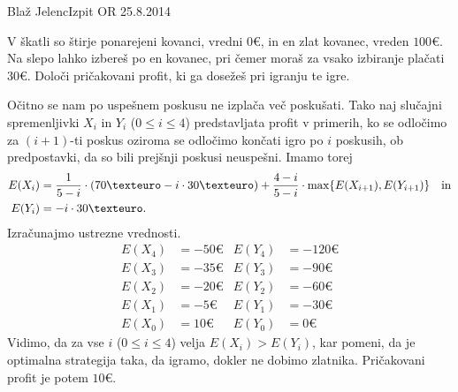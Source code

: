 \begin{naloga}{Blaž Jelenc}{Izpit OR 25.8.2014}
\begin{vprasanje}
V škatli so štirje ponarejeni kovanci, vredni $0 €$,
in en zlat kovanec, vreden $100 €$.
Na slepo lahko izbereš po en kovanec,
pri čemer moraš za vsako izbiranje plačati $30 €$.
Določi pričakovani profit, ki ga dosežeš pri igranju te igre.
\end{vprasanje}

\begin{odgovor}
Očitno se nam po uspešnem poskusu ne izplača več poskušati.
Tako naj slučajni spremenljivki $X_i$ in $Y_i$ ($0 \le i \le 4$)
predstavljata profit v primerih,
ko se odločimo za $(i+1)$-ti poskus
oziroma se odločimo končati igro po $i$ poskusih,
ob predpostavki, da so bili prejšnji poskusi neuspešni.
Imamo torej
\begin{align*}
E(X_i) &= {1 \over 5-i} \cdot (70 € - i \cdot 30 €)
    + {4-i \over 5-i} \cdot \max\{E(X_{i+1}), E(Y_{i+1})\}
\quad \text{in} \\
E(Y_i) &= -i \cdot 30 € .
\end{align*}
Izračunajmo ustrezne vrednosti.
\begin{align*}
E(X_4) &= -50 € & E(Y_4) &= -120 € \\
E(X_3) &= -35 € & E(Y_3) &= -90 € \\
E(X_2) &= -20 € & E(Y_2) &= -60 € \\
E(X_1) &=  -5 € & E(Y_1) &= -30 € \\
E(X_0) &=  10 € & E(Y_0) &=   0 €
\end{align*}
Vidimo, da za vse $i$ ($0 \le i \le 4$) velja $E(X_i) > E(Y_i)$,
kar pomeni, da je optimalna strategija taka,
da igramo, dokler ne dobimo zlatnika.
Pričakovani profit je potem $10 €$.
\end{odgovor}
\end{naloga}
